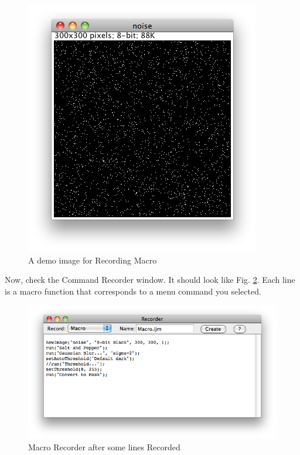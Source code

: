 \documentclass[11pt,a4paper,oneside]{report}
\begin{document}
\begin{figure}[htbp]
\begin{center}
\includegraphics[scale=0.6]{fig/SaltandPepper300.png}
\caption{A demo image for Recording Macro} 
\label{fig_SaltAndPepper}
\end{center}
\end{figure}

Now, check the Command Recorder window. 
It should look like Fig. \ref{fig_macroRecorderFilled}. 
Each line is a macro function that corresponds to a menu command you selected.

\begin{figure}[htbp]
\begin{center}
\includegraphics[scale=0.6]{fig/MacroRecorderFilled.png}
\caption{Macro Recorder after some lines Recorded} 
\label{fig_macroRecorderFilled}
\end{center}
\end{figure}
\end{document}
